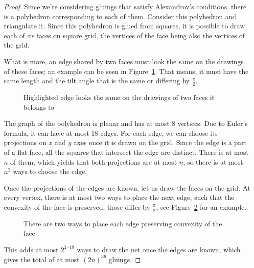 \documentclass[a4paper,11pt]{article}
\begin{document}
\begin{proof}
Since we're considering gluings that satisfy Alexandrov's conditions, there is a polyhedron corresponding to each of them. Consider this polyhedron and triangulate it. Since this polyhedron is glued from squares, it is possible to draw each of its faces on square grid, the vertices of the face being also the vertices of the grid.

What is more, an edge shared by two faces must look the same on the drawings of these faces; an example can be seen in Figure~\ref{fig:edgesMeeting}. That means, it must have the same length and the tilt angle that is the same or differing by $\frac{\pi}{2}$.

\begin{figure}[h] \centering
{}\hspace{1.2cm}
\caption{Highlighted edge looks the same on the drawings of two faces it belongs to}
\label{fig:edgesMeeting}
\end{figure}

The graph of the polyhedron is planar and has at most 8 vertices. Due to Euler's formula, it can have at most 18 edges. For each edge, we can choose its projections on $x$ and $y$ axes once it is drawn on the grid. Since the edge is a part of a flat face, all the squares that intersect the edge are distinct. There is at most $n$ of them, which yields that both projections are at most $n$, so there is at most $n^2$ ways to choose the edge.

Once the projections of the edges are known, let us draw the faces on the grid. At every vertex, there is at most two ways to place the next edge, such that the convexity of the face is preserved, those differ by $\frac{\pi}{2}$, see Figure~\ref{fig:twoWays} for an example.

\begin{figure}[h] \centering
{}
\caption{There are two ways to place each edge preserving convexity of the face}
\label{fig:twoWays}
\end{figure}

This adds at most $2^{2 \cdot 18}$ ways to draw the net once the edges are known, which gives the total of at most $(2n)^{36}$ gluings.
\end{proof}
\end{document}
